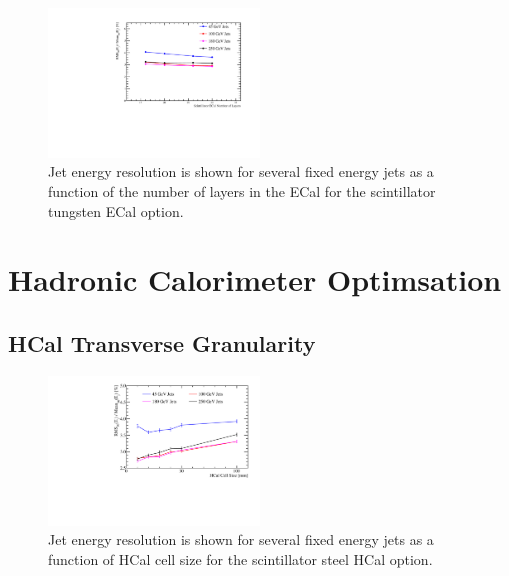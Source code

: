 \begin{figure}
  \includegraphics[width=0.5\textwidth]{OptimisationStudies/Plots/JetEnergyResolutions/JER_vs_ScintillatorECalNumberofLayers.pdf}
  \caption[Jet energy resolution as a function of the number of layers in the ECal for the scintillator tungsten ECal option.]{Jet energy resolution is shown for several fixed energy jets as a function of the number of layers in the ECal for the scintillator tungsten ECal option.}
  \label{optstud:fig:scecallayers}
\end{figure}

\section{Hadronic Calorimeter Optimsation}
\label{optstud:sec:hcal}

\subsection{HCal Transverse Granularity}
\label{optstud:sec:hcal:cellsize}

\begin{figure}
  \includegraphics[width=0.5\textwidth]{OptimisationStudies/Plots/JetEnergyResolutions/JER_vs_HCalCellSize.pdf}
  \caption[Jet energy resolution as a function of HCal cell size for the scintillator steel HCal option.]{Jet energy resolution is shown for several fixed energy jets as a function of HCal cell size for the scintillator steel HCal option.}
  \label{optstud:fig:hcalcells}
\end{figure}

